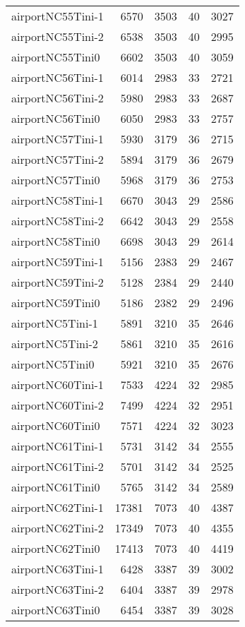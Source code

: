 \begin{longtable}{lrrrr}
airportNC55Tini-1 & 6570 & 3503 & 40 & 3027 \\
airportNC55Tini-2 & 6538 & 3503 & 40 & 2995 \\
airportNC55Tini0 & 6602 & 3503 & 40 & 3059 \\
airportNC56Tini-1 & 6014 & 2983 & 33 & 2721 \\
airportNC56Tini-2 & 5980 & 2983 & 33 & 2687 \\
airportNC56Tini0 & 6050 & 2983 & 33 & 2757 \\
airportNC57Tini-1 & 5930 & 3179 & 36 & 2715 \\
airportNC57Tini-2 & 5894 & 3179 & 36 & 2679 \\
airportNC57Tini0 & 5968 & 3179 & 36 & 2753 \\
airportNC58Tini-1 & 6670 & 3043 & 29 & 2586 \\
airportNC58Tini-2 & 6642 & 3043 & 29 & 2558 \\
airportNC58Tini0 & 6698 & 3043 & 29 & 2614 \\
airportNC59Tini-1 & 5156 & 2383 & 29 & 2467 \\
airportNC59Tini-2 & 5128 & 2384 & 29 & 2440 \\
airportNC59Tini0 & 5186 & 2382 & 29 & 2496 \\
airportNC5Tini-1 & 5891 & 3210 & 35 & 2646 \\
airportNC5Tini-2 & 5861 & 3210 & 35 & 2616 \\
airportNC5Tini0 & 5921 & 3210 & 35 & 2676 \\
airportNC60Tini-1 & 7533 & 4224 & 32 & 2985 \\
airportNC60Tini-2 & 7499 & 4224 & 32 & 2951 \\
airportNC60Tini0 & 7571 & 4224 & 32 & 3023 \\
airportNC61Tini-1 & 5731 & 3142 & 34 & 2555 \\
airportNC61Tini-2 & 5701 & 3142 & 34 & 2525 \\
airportNC61Tini0 & 5765 & 3142 & 34 & 2589 \\
airportNC62Tini-1 & 17381 & 7073 & 40 & 4387 \\
airportNC62Tini-2 & 17349 & 7073 & 40 & 4355 \\
airportNC62Tini0 & 17413 & 7073 & 40 & 4419 \\
airportNC63Tini-1 & 6428 & 3387 & 39 & 3002 \\
airportNC63Tini-2 & 6404 & 3387 & 39 & 2978 \\
airportNC63Tini0 & 6454 & 3387 & 39 & 3028 \\

\end{longtable}
